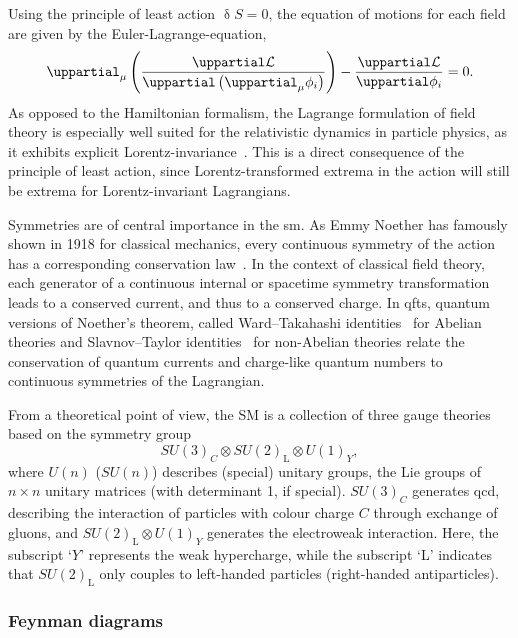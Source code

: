 Using the principle of least action $\updelta S = 0$, the equation of motions for each field are given by the Euler-Lagrange-equation,
\begin{equation}
	\uppartial_\mu\left(\frac{\uppartial\Lagr}{\uppartial\left(\uppartial_\mu\phi_i\right)}\right)-\frac{\uppartial\Lagr}{\uppartial\phi_i}=0.
	\label{eq:euler_lagrange}
\end{equation}
As opposed to the Hamiltonian formalism, the Lagrange formulation of field theory is especially well suited for the relativistic dynamics in particle physics, as it exhibits explicit Lorentz-invariance~\cite{Peskin:1995ev}. This is a direct consequence of the principle of least action, since Lorentz-transformed extrema in the action will still be extrema for Lorentz-invariant Lagrangians.

Symmetries are of central importance in the \gls{sm}. As Emmy Noether has famously shown in 1918 for classical mechanics, every continuous symmetry of the action has a corresponding conservation law~\cite{physics/0503066}. In the context of classical field theory, each generator of a continuous internal or spacetime symmetry transformation leads to a conserved current, and thus to a conserved charge. In \glspl{qft}, quantum versions of Noether's theorem, called Ward--Takahashi identities~\cite{PhysRev.78.182,Takahashi1957} for Abelian theories and Slavnov--Taylor identities~\cite{THOOFT1971173,TAYLOR1971436,Slavnov1972} for non-Abelian theories relate the conservation of quantum currents and charge-like quantum numbers to continuous symmetries of the Lagrangian.

From a theoretical point of view, the SM is a collection of three gauge theories based on the symmetry group
\begin{equation*}
	SU(3)_C \otimes SU(2)_\mathrm{L} \otimes U(1)_Y,
\end{equation*}
where $U(n)$ ($SU(n)$) describes (special) unitary groups, \ie the Lie groups of $n\times n$ unitary matrices (with determinant 1, if special). $SU(3)_C$ generates \gls{qcd}, describing the interaction of particles with colour charge $C$ through exchange of gluons, and $SU(2)_\mathrm{L} \otimes U(1)_Y$ generates the electroweak interaction. Here, the subscript `$Y$' represents the weak hypercharge, while the subscript `L' indicates that $SU(2)_\mathrm{L}$ only couples to left-handed particles (right-handed antiparticles).

\subsubsection{Feynman diagrams}

